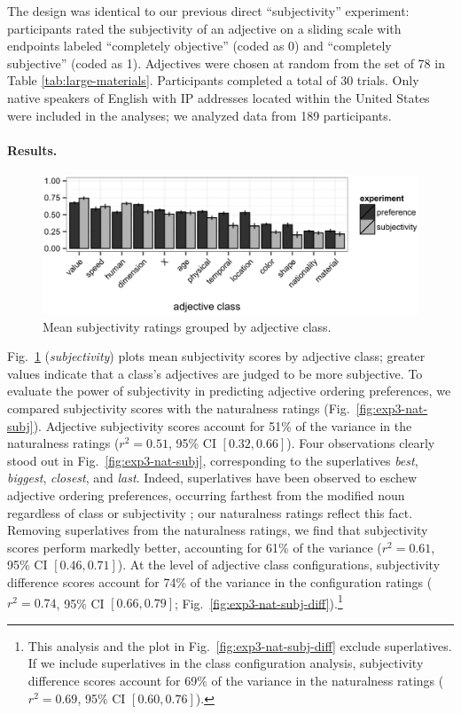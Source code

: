 \documentclass[12pt]{article}
\begin{document}
The design was identical to our previous direct ``subjectivity'' experiment: participants rated the subjectivity of an adjective on a sliding scale with endpoints labeled ``completely objective'' (coded as 0) and ``completely subjective'' (coded as 1). Adjectives were chosen at random from the set of 78 in Table \ref{tab:large-materials}. Participants completed a total of 30 trials. Only native speakers of English with IP addresses located within the United States were included in the analyses; we analyzed data from 189 participants.

\paragraph{Results.}

\begin{figure}
	\centering\includegraphics[width=6in]{plots/expt3_results.eps}
	\caption{Mean subjectivity ratings grouped by adjective class.}\label{fig:exp3-results}
\end{figure}

Fig.~\ref{fig:exp3-results} (\emph{subjectivity}) plots mean subjectivity scores by adjective class; greater values indicate that a class's adjectives are judged to be more subjective. To evaluate the power of subjectivity in predicting adjective ordering preferences, we compared subjectivity scores with the naturalness ratings (Fig.~\ref{fig:exp3-nat-subj}). Adjective subjectivity scores account for 51\% of the variance in the naturalness ratings ($r^2=0.51$, 95\% CI $[0.32, 0.66]$). Four observations clearly stood out in Fig.~\ref{fig:exp3-nat-subj}, corresponding to the superlatives \emph{best}, \emph{biggest}, \emph{closest}, and \emph{last}. Indeed, superlatives have been observed to eschew adjective ordering preferences, occurring farthest from the modified noun regardless of class or subjectivity \citep{dixon1982}; our naturalness ratings reflect this fact. Removing superlatives from the naturalness ratings, we find that subjectivity scores perform markedly better, accounting for 61\% of the variance ($r^2=0.61$, 95\% CI $[0.46, 0.71]$). At the level of adjective class configurations, subjectivity difference scores account for 74\% of the variance in the configuration ratings ($r^2=0.74$, 95\% CI $[0.66, 0.79]$; Fig.~\ref{fig:exp3-nat-subj-diff}).\footnote{This analysis and the plot in Fig.~\ref{fig:exp3-nat-subj-diff} exclude superlatives. If we include superlatives in the class configuration analysis, subjectivity difference scores account for 69\% of the variance in the naturalness ratings ($r^2=0.69$, 95\% CI $[0.60,  0.76]$).}
\end{document}
